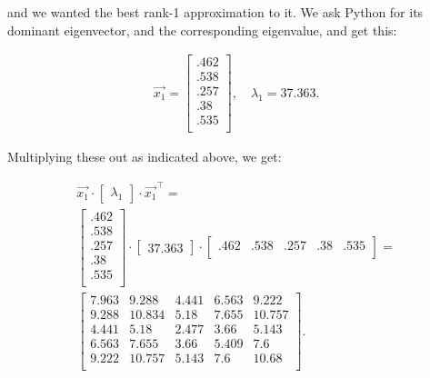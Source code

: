 \begin{alttitles}
and we wanted the best rank-1 approximation to it. We ask Python for its
dominant eigenvector, and the corresponding eigenvalue, and get this:

\vspace{-.15in}
\begin{align*}
\overrightarrow{x_1} = 
\begin{bmatrix}
.462 \\ .538 \\ .257 \\ .38 \\ .535 \\
\end{bmatrix}, \quad
\lambda_1 = 37.363.
\end{align*}
\vspace{-.15in}

Multiplying these out as indicated above, we get:

\vspace{-.15in}
\begin{gather*}
\overrightarrow{x_1} \cdot \begin{bmatrix} \lambda_1 \end{bmatrix} \cdot \overrightarrow{x_1}^\intercal =\\
\begin{bmatrix}
.462 \\ .538 \\ .257 \\ .38 \\ .535 \\
\end{bmatrix} \cdot
\begin{bmatrix}
37.363
\end{bmatrix} \cdot
\begin{bmatrix}
.462 & .538 & .257 & .38 & .535 \\
\end{bmatrix} = \\
\begin{bmatrix}
7.963 & 9.288 & 4.441 & 6.563 & 9.222\\
9.288 & 10.834 & 5.18 & 7.655 & 10.757\\
4.441 & 5.18 & 2.477 & 3.66 & 5.143\\
6.563 & 7.655 & 3.66 & 5.409 & 7.6 \\
9.222 & 10.757 & 5.143 & 7.6 & 10.68 \\
\end{bmatrix}.
\end{gather*}
\vspace{-.05in}


\end{alttitles}
